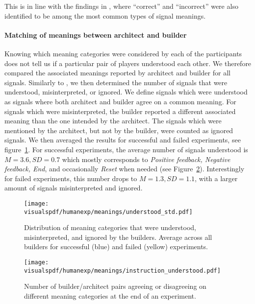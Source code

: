This is in line with the findings in \cite{griffiths2012bottom}, where ``correct'' and ``incorrect'' were also identified to be among the most common types of signal meanings.

\paragraph{Matching of meanings between architect and builder} 

Knowing which meaning categories were considered by each of the participants does not tell us if a particular pair of players understood each other. We therefore compared the associated meanings reported by architect and builder for all signals. Similarly to \cite{griffiths2012bottom}, we then determined the number of signals that were understood, misinterpreted, or ignored. We define signals which were understood as signals where both architect and builder agree on a common meaning. For signals which were misinterpreted, the builder reported a different associated meaning than the one intended by the architect. The signals which were mentioned by the architect, but not by the builder, were counted as ignored signals. We then averaged the results for successful and failed experiments, see figure~\ref{fig:types_of_understanding}. For successful experiments, the average number of signals understood is $M = 3.6, SD = 0.7$ which mostly corresponds to \emph{Positive feedback, Negative feedback, End}, and occasionally \emph{Reset} when needed (see Figure~\ref{fig:understanding_per_feedback}). Interestingly for failed experiments, this number drops to $M = 1.3, SD = 1.1$, with a larger amount of signals misinterpreted and ignored.

\begin{figure}[!htbp]
    \begin{center}
      \texttt{[image: \\visualspdf/humanexp/meanings/understood\_std.pdf]}
        \caption{Distribution of meaning categories that were understood, misinterpreted, and ignored by the builders. Average across all builders for successful (blue) and failed (yellow) experiments.}
      \label{fig:types_of_understanding}
    \end{center}
\end{figure}

\begin{figure}[!htbp]
  \begin{center}
      \texttt{[image: \\visualspdf/humanexp/meanings/instruction\_understood.pdf]}
      \caption{Number of builder/architect pairs agreeing or disagreeing on different meaning categories at the end of an experiment.}
    \label{fig:understanding_per_feedback}
    \end{center}
\end{figure}

